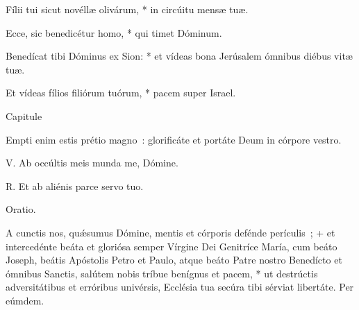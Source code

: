 Fílii tui sicut novéllæ olivárum, * in circúitu mensæ tuæ.

Ecce, sic benedicétur homo, * qui timet Dóminum.

Benedícat tibi Dóminus ex Sion: * et vídeas bona Jerúsalem ómnibus diébus vitæ tuæ.

Et vídeas fílios filiórum tuórum, * pacem super Israel.


Capitule

Empti enim estis prétio magno~: glorificáte et portáte Deum in córpore vestro.


V. Ab occúltis meis munda me, Dómine.

R. Et ab aliénis parce servo tuo.




Oratio.

A cunctis nos, quǽsumus Dómine, mentis et córporis defénde perículis~; + et intercedénte beáta et gloriósa semper Vírgine Dei Genitríce María, cum beáto Joseph, beátis Apóstolis Petro et Paulo, atque beáto Patre nostro Benedícto et ómnibus Sanctis, salútem nobis tríbue benígnus et pacem, * ut destrúctis adversitátibus et erróribus univérsis, Ecclésia tua secúra tibi sérviat libertáte. Per eúmdem.







